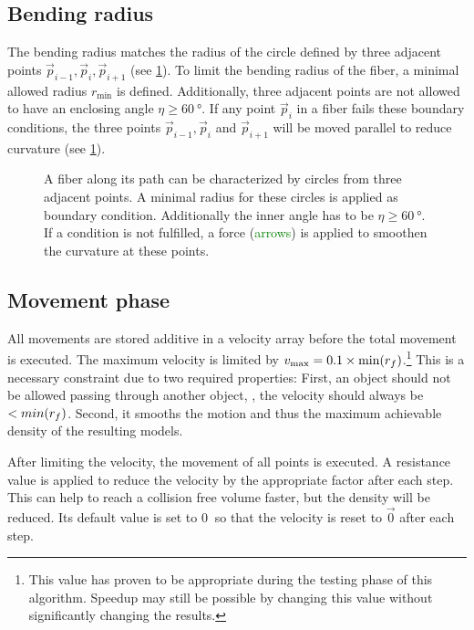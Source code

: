 \subsection{Bending radius}
%
The bending radius matches the radius of the circle defined by three adjacent points $\vec{p}_{i-1}, \vec{p}_{i}, \vec{p}_{i+1}$ (see \cref{fig:modelCircle}).
To limit the bending radius of the fiber, a minimal allowed radius $r_{\min}$ is defined.
Additionally, three adjacent points are not allowed to have an enclosing angle $\eta \geq \SI{60}{\degree}$.
If any point $\vec{p}_{i}$ in a fiber fails these boundary conditions, the three points $\vec{p}_{i-1}, \vec{p}_{i}$ and $\vec{p}_{i+1}$ will be moved parallel to reduce curvature (see \cref{fig:modelCircle}).
%
\begin{figure}[!t]
    \centering
    \setlength{\tikzheight}{.75\textwidth}
	\caption[]{A fiber along its path can be characterized by circles from three adjacent points.
    A minimal radius for these circles is applied as boundary condition.
    Additionally the inner angle has to be $\eta \geq \SI{60}{\degree}$.
    If a condition is not fulfilled, a force (\textcolor{GREEN}{arrows}) is applied to smoothen the curvature at these points.}
	\label{fig:modelCircle}
\end{figure}
%
%
%
\subsection{Movement phase}
%
All movements are stored additive in a velocity array before the total movement is executed.
The maximum velocity is limited by $v_{\max} = 0.1 \times \min(\mathit{\textnormal{$r_f$}})$.\footnote{This value has proven to be appropriate during the testing phase of this algorithm. Speedup may still be possible by changing this value without significantly changing the results.}
This is a necessary constraint due to two required properties:
First, an object should not be allowed passing through another object, \ie{}, the velocity should always be $<min(\textnormal{$r_f$})$.
Second, it smooths the motion and thus the maximum achievable density of the resulting models.
\par
%
After limiting the velocity, the movement of all points is executed.
A resistance value is applied to reduce the velocity by the appropriate factor after each step.
This can help to reach a collision free volume faster, but the density will be reduced.
Its default value is set to $\SI{0}{}$ so that the velocity is reset to $\vec{0}$ after each step.
%
%
%
